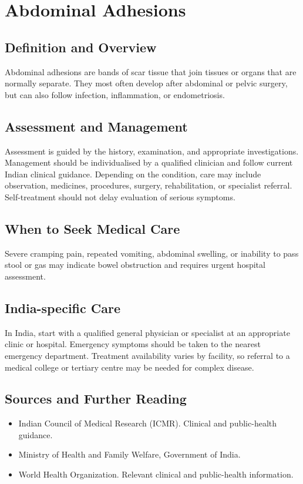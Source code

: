 \chapter{Abdominal Adhesions}

\section*{Definition and Overview}
Abdominal adhesions are bands of scar tissue that join tissues or organs that are normally separate. They most often develop after abdominal or pelvic surgery, but can also follow infection, inflammation, or endometriosis.

\section*{Assessment and Management}
Assessment is guided by the history, examination, and appropriate investigations. Management should be individualised by a qualified clinician and follow current Indian clinical guidance. Depending on the condition, care may include observation, medicines, procedures, surgery, rehabilitation, or specialist referral. Self-treatment should not delay evaluation of serious symptoms.

\section*{When to Seek Medical Care}
Severe cramping pain, repeated vomiting, abdominal swelling, or inability to pass stool or gas may indicate bowel obstruction and requires urgent hospital assessment.

\section*{India-specific Care}
In India, start with a qualified general physician or specialist at an appropriate clinic or hospital. Emergency symptoms should be taken to the nearest emergency department. Treatment availability varies by facility, so referral to a medical college or tertiary centre may be needed for complex disease.

\section*{Sources and Further Reading}
\begin{itemize}
    \item Indian Council of Medical Research (ICMR). Clinical and public-health guidance.
    \item Ministry of Health and Family Welfare, Government of India.
    \item World Health Organization. Relevant clinical and public-health information.
\end{itemize}
